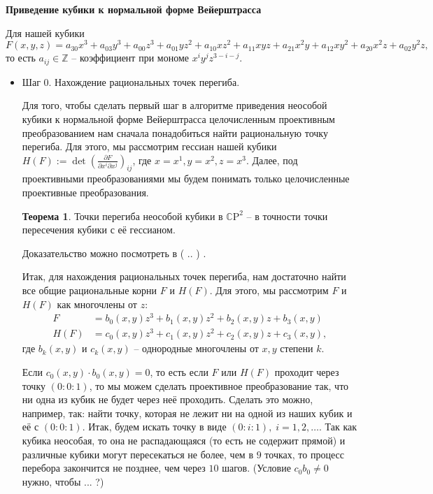 \documentclass[a4paper,12pt]{article}
\newcommand\Z{\ensuremath{\mathbb{Z}}}
\newcommand\C{\ensuremath{\mathbb{C}}}
\theoremstyle{definition}
\newtheorem*{theoremf}{Теорема}
\begin{document}
    \begin{center}
        \textbf{Приведение кубики к нормальной форме Вейерштрасса}
    \end{center}

    Для нашей кубики 
    \[
    F(x, y, z) = a_{30} x^3 + a_{03} y^3 + a_{00} z^3 + a_{01} y z^2 + a_{10} x z^2 +
    a_{11} x y z + a_{21} x^2 y + a_{12} x y^2 + a_{20} x^2 z + a_{02} y^2 z
    ,\] 
    то есть \(a_{ij} \in \Z\) -- коэффициент при мономе \(x^{i} y^{j} z^{3 - i -
    j}\). 



    \begin{itemize}[leftmargin=0.6cm]
        
        \item Шаг 0. Нахождение рациональных точек перегиба. 

        Для того, чтобы сделать первый шаг в алгоритме приведения неособой
        кубики к нормальной форме Вейерштрасса целочисленным проективным
        преобразованием нам сначала понадобиться найти рациональную точку
        перегиба. Для этого, мы рассмотрим гессиан нашей кубики \(H(F) := \det \left(
        \frac{\partial F}{\partial x^{i} \partial x^{j}}\right)_{ij}\), где \(x =
        x^{1}, y = x^{2}, z = x^{3}\). Далее, под проективными
        преобразованиями мы будем понимать только целочисленные проективные
        преобразования.

        \begin{theoremf}
            Точки перегиба неособой кубики в \(\C \mathrm{P}^2\) -- в точности
            точки пересечения кубики с её гессианом.
        \end{theoremf}

        Доказательство можно посмотреть в ( .. ) .

        Итак, для нахождения рациональных точек перегиба, нам достаточно найти
        все общие рациональные корни \(F\) и \(H(F)\). Для этого, мы
        рассмотрим \(F\) и \(H(F)\) как многочлены от \(z\):
        \begin{align*}
            F &= b_0(x, y) z^3 + b_1(x, y) z^2 + b_2(x, y) z + b_3(x, y) \\
            H(F) &= c_0(x, y) z^3 + c_1(x, y) z^2 + c_2(x, y) z + c_3(x, y) 
        ,\end{align*}
        где \(b_k(x, y)\) и \(c_k(x, y)\) -- однородные многочлены от \(x, y\) 
        степени \(k\). 

        Если \(c_0(x, y) \cdot b_0(x, y) = 0\), то есть если
        \(F\) или \(H(F)\) проходит через точку \((0 : 0 : 1)\), то мы можем
        сделать проективное преобразование так, что ни одна из кубик не будет
        через неё проходить. Сделать это можно, например, так: найти точку,
        которая не лежит ни на одной из наших кубик и  её
        с \((0 : 0 : 1)\). Итак, будем искать точку в виде \((0 : i : 1), \; i
        = 1, 2, \ldots\).
        Так как кубика неособая, то она не распадающаяся (то есть не содержит
        прямой) и различные кубики могут пересекаться не более, чем в \(9\) 
        точках, то процесс перебора закончится не позднее, чем через \(10\) 
        шагов. (Условие \(c_0 b_0 \ne 0\) нужно, чтобы ... ?)


\end{itemize}
\end{document}
